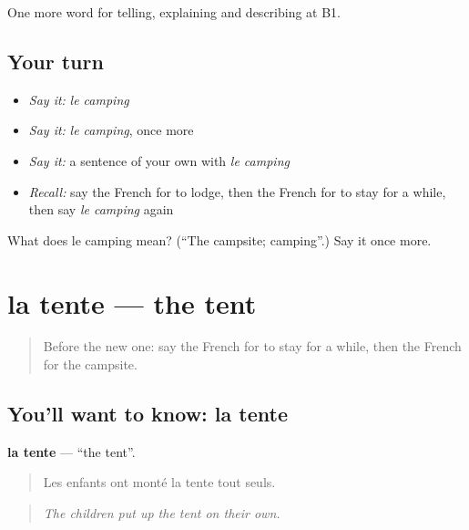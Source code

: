 \begin{grammarlens}[title={What you've built}]
One more word for telling, explaining and describing at B1.
\end{grammarlens}

\subsection*{Your turn}
\begin{itemize}
\raggedright
  \item \emph{Say it:} \emph{le camping}
  \item \emph{Say it:} \emph{le camping}, once more
  \item \emph{Say it:} a sentence of your own with \emph{le camping}
  \item \emph{Recall:} say the French for to lodge, then the French for to stay for a while, then say \emph{le camping} again
\end{itemize}

\begin{tcolorbox}[breakable,colback=teal!4,colframe=teal!35!black,title={Before you move on}]
What does le camping mean? (\textquotedblleft{}The campsite; camping\textquotedblright{}.) Say it once more.
\end{tcolorbox}
\section[la tente]{la tente — the tent}

\label{lesson:FR-C425-tente}



\begin{quote}
Before the new one: say the French for to stay for a while, then the French for the campsite.
\end{quote}

\subsection*{You'll want to know: la tente}
\textbf{la tente} — \textquotedblleft{}the tent\textquotedblright{}.

\begin{quote}
Les enfants ont monté la tente tout seuls.
\end{quote}

\begin{quote}
\emph{The children put up the tent on their own.}
\end{quote}

